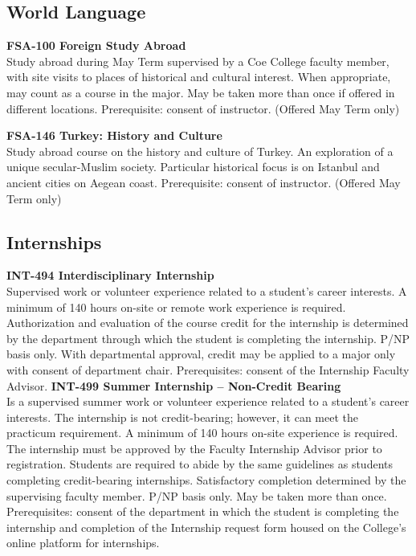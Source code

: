 \documentclass[
  letterpaper,
]{scrbook}
\begin{document}
\subsection{World Language}\label{sec-academic-programs-world-language}

\textbf{FSA-100 Foreign Study Abroad}\\
Study abroad during May Term supervised by a Coe College faculty member,
with site visits to places of historical and cultural interest. When
appropriate, may count as a course in the major. May be taken more than
once if offered in different locations. Prerequisite: consent of
instructor. (Offered May Term only)

\textbf{FSA-146 Turkey: History and Culture}\\
Study abroad course on the history and culture of Turkey. An exploration
of a unique secular-Muslim society. Particular historical focus is on
Istanbul and ancient cities on Aegean coast. Prerequisite: consent of
instructor. (Offered May Term only)

\subsection{Internships}\label{sec-academic-programs-internships}

\textbf{INT-494 Interdisciplinary Internship}\\
Supervised work or volunteer experience related to a student's career
interests. A minimum of 140 hours on-site or remote work experience is
required. Authorization and evaluation of the course credit for the
internship is determined by the department through which the student is
completing the internship. P/NP basis only. With departmental approval,
credit may be applied to a major only with consent of department chair.
Prerequisites: consent of the Internship Faculty Advisor.
\textbf{INT-499 Summer Internship -- Non-Credit Bearing}\\
Is a supervised summer work or volunteer experience related to a
student's career interests. The internship is not credit-bearing;
however, it can meet the practicum requirement. A minimum of 140 hours
on-site experience is required. The internship must be approved by the
Faculty Internship Advisor prior to registration. Students are required
to abide by the same guidelines as students completing credit-bearing
internships. Satisfactory completion determined by the supervising
faculty member. P/NP basis only. May be taken more than once.
Prerequisites: consent of the department in which the student is
completing the internship and completion of the Internship request form
housed on the College's online platform for internships.
\end{document}
